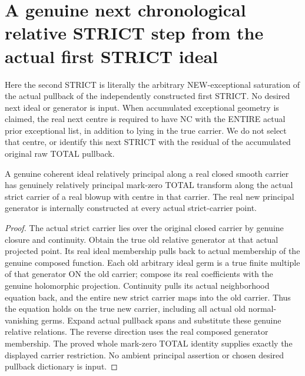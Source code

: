 \section{A genuine next chronological relative STRICT step from the actual first STRICT ideal}

Here the second STRICT is literally the arbitrary NEW-exceptional saturation
of the actual pullback of the independently constructed first STRICT. No
desired next ideal or generator is input. When accumulated exceptional
geometry is claimed, the real next centre is required to have NC with the
ENTIRE actual prior exceptional list, in addition to lying in the true
carrier. We do not select that centre, or identify this next STRICT with the
residual of the accumulated original raw TOTAL pullback.

\begin{lemma}
\label{hir:sharp-actual-relative-principal-next-total-pullback}
\leanok
A genuine coherent ideal relatively principal along a real closed smooth
carrier has genuinely relatively principal mark-zero TOTAL transform along
the actual strict carrier of a real blowup with centre in that carrier.
The real new principal generator is internally constructed at every actual
strict-carrier point.
\end{lemma}
\begin{proof}
The actual strict carrier lies over the original closed carrier by genuine
closure and continuity. Obtain the true old relative generator at that
actual projected point. Its real ideal membership pulls back to actual
membership of the genuine composed function. Each old arbitrary ideal germ
is a true finite multiple of that generator ON the old carrier; compose
its real coefficients with the genuine holomorphic projection. Continuity
pulls its actual neighborhood equation back, and the entire new strict
carrier maps into the old carrier. Thus the equation holds on the true new
carrier, including all actual old normal-vanishing germs. Expand actual
pullback spans and substitute these genuine relative relations. The reverse
direction uses the real composed generator membership. The proved whole
mark-zero TOTAL identity supplies exactly the displayed carrier restriction.
No ambient principal assertion or chosen desired pullback dictionary is input.
\end{proof}

